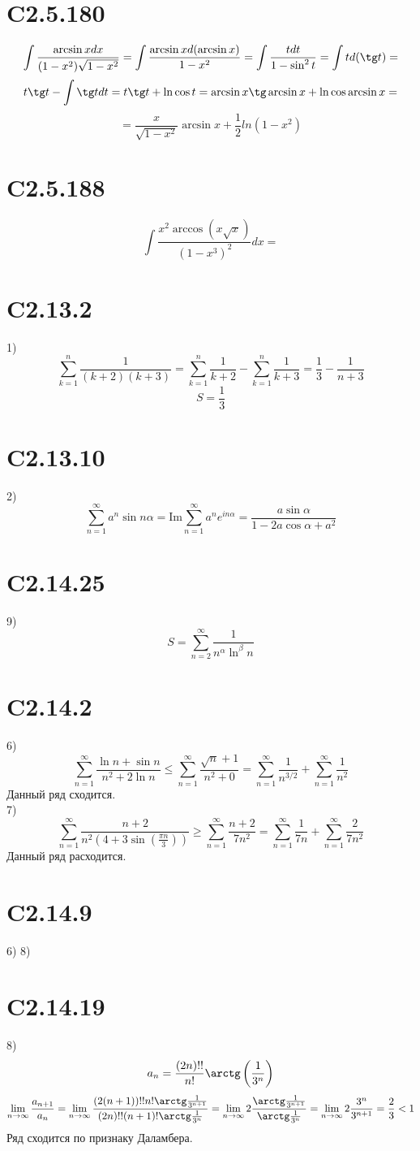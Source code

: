 \documentclass[a4paper,12pt]{article} %
\begin{document}
\section*{C2.5.180}$$\int\frac{\arcsin xdx}{(1-x^2)\sqrt{1-x^2}}=\int\frac{\arcsin xd(\arcsin x)}{1-x^2}=\int\frac{tdt}{1-\sin^2t}=\int td(\tg t)=$$
$$t\tg t-\int\tg tdt=t\tg t+\ln\cos t=\arcsin x\tg\arcsin x+\ln\cos\arcsin x=$$
$$=\frac{x}{\sqrt{1-x^2}}\arcsin x+\frac{1}{2}ln(1-x^2)$$
\section*{C2.5.188}$$\int\frac{x^2\arccos(x\sqrt{x})}{(1-x^3)^2}dx=$$
\section*{C2.13.2}1)$$\sum_{k=1}^{n}\frac{1}{(k+2)(k+3)}=\sum_{k=1}^{n}\frac{1}{k+2}-\sum_{k=1}^{n}\frac{1}{k+3}=\frac{1}{3}-\frac{1}{n+3}$$
$$S=\frac{1}{3}$$
\section*{C2.13.10}2)$$\sum_{n=1}^{\infty}a^n\sin n\alpha=\mathrm{Im}\sum_{n=1}^{\infty}a^ne^{in\alpha}=\frac{a\sin\alpha}{1-2a\cos\alpha+a^2}$$
\section*{C2.14.25}9)$$S=\sum_{n=2}^{\infty}\frac{1}{n^{\alpha}\ln^{\beta}n}$$
\section*{C2.14.2}6)$$\sum_{n=1}^{\infty}\frac{\ln n+\sin n}{n^2+2\ln n}\le\sum_{n=1}^{\infty}\frac{\sqrt{n}+1}{n^2+0}=\sum_{n=1}^{\infty}\frac{1}{n^{3/2}}+\sum_{n=1}^{\infty}\frac{1}{n^{2}}$$
Данный ряд сходится.\\
7)$$\sum_{n=1}^{\infty}\frac{n+2}{n^{2}(4+3\sin\left(\frac{\pi n}{3}\right))}\ge\sum_{n=1}^{\infty}\frac{n+2}{7n^2}=\sum_{n=1}^{\infty}\frac{1}{7n}+\sum_{n=1}^{\infty}\frac{2}{7n^2}$$
Данный ряд расходится.
\section*{C2.14.9}6)
8)
\section*{C2.14.19}8)$$a_{n}=\frac{(2n)!!}{n!}\arctg\left(\frac{1}{3^n}\right)$$
$$\lim_{n\to\infty}\frac{a_{n+1}}{a_{n}}=\lim_{n\to\infty}\frac{(2(n+1))!!n!\arctg\frac{1}{3^{n+1}}}{(2n)!!(n+1)!\arctg\frac{1}{3^{n}}}=\lim_{n\to\infty}2\frac{\arctg\frac{1}{3^{n+1}}}{\arctg\frac{1}{3^{n}}}=\lim_{n\to\infty}2\frac{3^{n}}{3^{n+1}}=\frac{2}{3}<1$$
Ряд сходится по признаку Даламбера.
\end{document}
